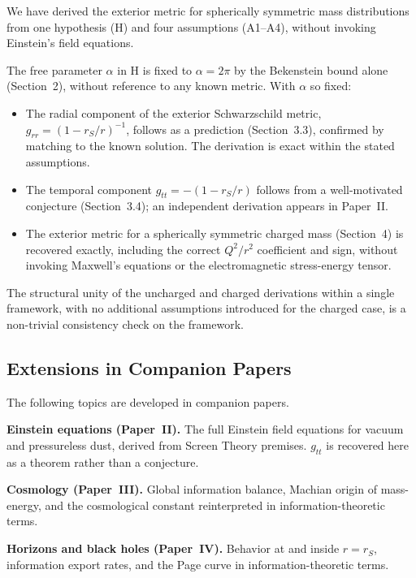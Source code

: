 \documentclass[12pt]{article}
\begin{document}
We have derived the exterior metric for spherically symmetric mass
distributions from one hypothesis (H) and four assumptions (A1--A4),
without invoking Einstein's field equations.

The free parameter $\alpha$ in H is fixed to $\alpha = 2\pi$ by the
Bekenstein bound alone (Section~2), without reference to any known
metric.
With $\alpha$ so fixed:

\begin{itemize}

\item The radial component of the exterior Schwarzschild metric,
$g_{rr} = (1 - r_S/r)^{-1}$, follows as a prediction (Section~3.3),
confirmed by matching to the known solution.
The derivation is exact within the stated assumptions.

\item The temporal component $g_{tt} = -(1 - r_S/r)$ follows from a
well-motivated conjecture (Section~3.4); an independent derivation
appears in Paper~II.

\item The exterior metric for a spherically symmetric charged mass
(Section~4) is recovered exactly, including the correct $Q^2/r^2$
coefficient and sign, without invoking Maxwell's equations or the
electromagnetic stress-energy tensor.

\end{itemize}

The structural unity of the uncharged and charged derivations within
a single framework, with no additional assumptions introduced for the
charged case, is a non-trivial consistency check on the framework.

\subsection{Extensions in Companion Papers}

The following topics are developed in companion papers.

\medskip
\noindent\textbf{Einstein equations (Paper~II).}
The full Einstein field equations for vacuum and pressureless dust,
derived from Screen Theory premises.
$g_{tt}$ is recovered here as a theorem rather than a conjecture.

\medskip
\noindent\textbf{Cosmology (Paper~III).}
Global information balance, Machian origin of mass-energy, and the
cosmological constant reinterpreted in information-theoretic terms.

\medskip
\noindent\textbf{Horizons and black holes (Paper~IV).}
Behavior at and inside $r = r_S$, information export rates, and the
Page curve in information-theoretic terms.
\end{document}
